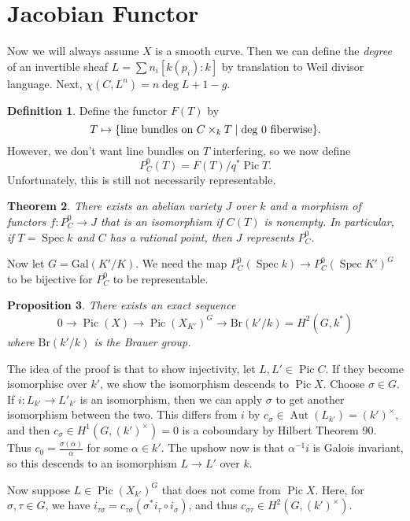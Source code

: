 \documentclass[leqno, openany]{memoir}
\newtheorem{thm}{Theorem}[section]
\newtheorem{prop}[thm]{Proposition}
\theoremstyle{definition}
\newtheorem{defn}[thm]{Definition}
\theoremstyle{remark}
\theoremstyle{plain}
\theoremstyle{definition}
\theoremstyle{remark}
\newcommand{\mr}[1]{\mathrm{#1}}
\DeclareMathOperator{\Aut}{Aut}
\DeclareMathOperator{\Pic}{Pic}
\DeclareMathOperator{\Spec}{Spec}
\begin{document}
\section{Jacobian Functor}%
\label{sec:jacobian_functor}

Now we will always assume $X$ is a smooth curve. Then we can define the \textit{degree} of an invertible sheaf $L = \sum n_i [k(p_i) : k]$ by translation to Weil divisor language. Next, $\chi(C, L^n) = n \deg L + 1 - g$.

\begin{defn}
    Define the functor $F(T)$ by
    \[ T \mapsto \qty{\text{line bundles on }C \times_k T \mid \text{deg $0$ fiberwise}}. \]
    However, we don't want line bundles on $T$ interfering, so we now define
    \[ P_C^0(T) = F(T) / q^* \Pic T. \]
    Unfortunately, this is still not necessarily representable.
\end{defn}

\begin{thm}
    There exists an abelian variety $J$ over $k$ and a morphism of functors $f \colon P_C^0 \to J$ that is an isomorphism if $C(T)$ is nonempty. In particular, if $T = \Spec k$ and $C$ has a rational point, then $J$ represents $P_C^0$.
\end{thm}

Now let $G = \mr{Gal}(K'/K)$. We need the map $P_C^0(\Spec k) \to P_C^0(\Spec K')^G$ to be bijective for $P_C^0$ to be representable.

\begin{prop}
    There exists an exact sequence
    \[ 0 \to \Pic(X) \to \Pic(X_{K'})^G \to \mr{Br}(k'/k) = H^2(G, k^*) \]
    where $\mr{Br}(k'/k)$ is the Brauer group.
\end{prop}

The idea of the proof is that to show injectivity, let $L, L' \in \Pic C$. If they become isomorphisc over $k'$, we show the isomorphism descends to $\Pic X$. Choose $\sigma \in G$. If $i \colon L_{k'} \to L'_{k'}$ is an isomorphism, then we can apply $\sigma$ to get another isomorphism between the two. This differs from $i$ by $c_{\sigma} \in \Aut(L_{k'}) = (k')^{\times}$, and then $c_{\sigma} \in H^1(G, (k')^{\times}) = 0$ is a coboundary by Hilbert Theorem 90. Thus $c_0 = \frac{\sigma(\alpha)}{\alpha}$ for some $\alpha \in k'$. The upshow now is that $\alpha^{-1} i$ is Galois invariant, so this descends to an isomorphism $L \to L'$ over $k$.

Now suppose $L \in \Pic {(X_{k'})}^G$ that does not come from $\Pic X$. Here, for $\sigma, \tau \in G$, we have $i_{\tau\sigma} = c_{\tau\sigma} (\sigma^*i_{\tau} \circ i_{\sigma})$, and thus $c_{\sigma \tau} \in H^2(G, {(k')}^{\times})$.
\end{document}
